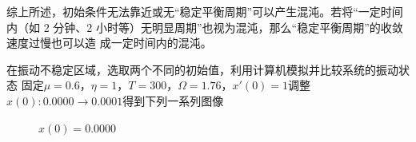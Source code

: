 \documentclass[dvipsnames, svgnames,a4paper,11pt]{article}
\begin{document}
\begin{question}
{综上所述，初始条件无法靠近或无“稳定平衡周期”可以产生混沌。若将“一定时间内（如
2 分钟、2 小时等）无明显周期”也视为混沌，那么“稳定平衡周期”的收敛速度过慢也可以造
成一定时间内的混沌。}
\end{question}

\begin{question}
	在振动不稳定区域，选取两个不同的初始值，利用计算机模拟并比较系统的振动状态
	\tcblower
	固定$\mu=0.6$，$\eta=1$，$T=300$，$\Omega=1.76$，$x'(0)=1$调整$x(0):0.0000\to 0.0001$得到下列一系列图像
	\begin{figure}[H]     
		\centering  %
	
		\caption{$x(0)=0.0000$}     
	\end{figure}

	\begin{figure}[H]     
		\centering  %
	

\end{figure}
\end{question}
\end{document}
